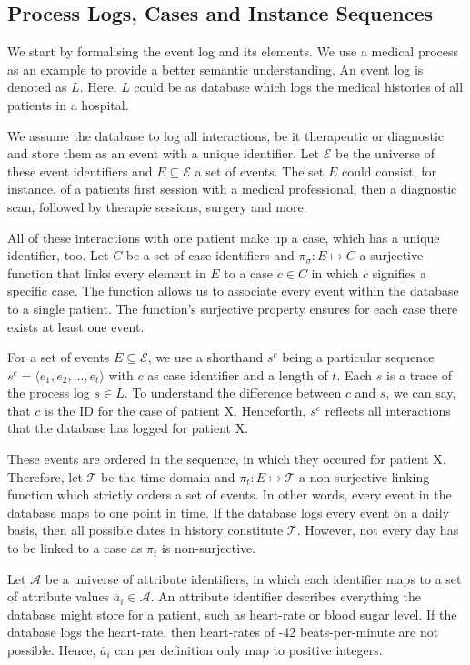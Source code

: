 \documentclass[./../../paper.tex]{subfiles}
\begin{document}
\subsection{Process Logs, Cases and Instance Sequences}


We start by formalising the event log and its elements. We use a medical process as an example to provide a better semantic understanding. An event log is denoted as $L$. Here, $L$ could be as database which logs the medical histories of all patients in a hospital. 

We assume the database to log all interactions, be it therapeutic or diagnostic and store them as an event with a unique identifier. Let $\mathcal{E}$ be the universe of  these event identifiers and $E \subseteq \mathcal{E}$ a set of events. The set $E$ could consist, for instance, of a patients first session with a medical professional, then a diagnostic scan, followed by therapie sessions, surgery and more. 

All of these interactions with one patient make up a case, which has a unique identifier, too. Let $C$ be a set of case identifiers and $\pi_\sigma : E \mapsto C$ a surjective function that links every element in $E$ to a case $c \in C$ in which $c$ signifies a specific case. The function allows us to associate every event within the database to a single patient. The function's surjective property ensures for each case there exists at least one event.

For a set of events $E \subseteq \mathcal{E}$, we use a shorthand $s^c$ being a particular sequence $s^c = \langle e_1, e_2, \ldots, e_t \rangle$ with $c$ as case identifier and a length of $t$. Each $s$ is a trace of the process log $s \in L$. To understand the difference between $c$ and $s$, we can say, that $c$ is the ID for the case of patient X. Henceforth, $s^c$ reflects all interactions that the database has logged for patient X. 


These events are ordered in the sequence, in which they occured for patient X.  Therefore, let $\mathcal{T}$ be the time domain and $\pi_t : E \mapsto \mathcal{T}$ a non-surjective linking function which strictly orders a set of events. In other words, every event in the database maps to one point in time. If the database logs every event on a daily basis, then all possible dates in history constitute $\mathcal{T}$. However, not every day has to be linked to a case as $\pi_t$ is non-surjective. 

Let $\mathcal{A}$ be a universe of attribute identifiers,  in which each identifier maps to a set of attribute values $\overline{a}_i \in \mathcal{A}$. An attribute identifier describes everything the database might store for a patient, such as heart-rate or blood sugar level. If the database logs the heart-rate, then heart-rates of -42 beats-per-minute are not possible. Hence, $\overline{a}_i$ can per definition only map to positive integers. 
\end{document}
